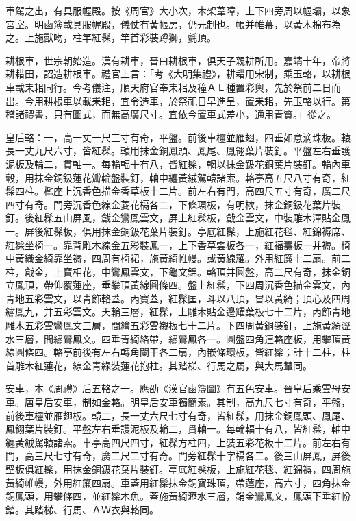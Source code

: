 車駕之出，有具服幄殿。按《周官》大小次，木架葦障，上下四旁周以幄壩，以象宮室。明鹵簿載具服幄殿，儀仗有黃帳房，仍元制也。帳并帷幕，以黃木棉布為之。上施獸吻，柱竿紅髹，竿首彩裝蹲獅，氈頂。

耕根車，世宗朝始造。漢有耕車，晉曰耕根車，俱天子親耕所用。嘉靖十年，帝將耕耤田，詔造耕根車。禮官上言：「考《大明集禮》，耕耤用宋制，乘玉輅，以耕根車載耒耜同行。今考儀注，順天府官奉耒耜及穜ＡＬ種置彩輿，先於祭前二日而出。今用耕根車以載耒耜，宜令造車，於祭祀日早進呈，置耒耜，先玉輅以行。第稽諸禮書，只有圖式，而無高廣尺寸。宜依今置車式差小，通用青質。」從之。

皇后輅：一，高一丈一尺三寸有奇，平盤。前後車欞並雁翅，四垂如意滴珠板。轅長一丈九尺六寸，皆紅髹。轅用抹金銅鳳頭、鳳尾、鳳翎葉片裝釘。平盤左右垂護泥板及輪二，貫軸一。每輪輻十有八，皆紅髹，輞以抹金鈒花銅葉片裝釘。輪內車轂，用抹金銅鈒蓮花瓣輪盤裝釘，軸中纏黃絨駕轅諸索。輅亭高五尺八寸有奇，紅髹四柱。檻座上沉香色描金香草板十二片。前左右有門，高四尺五寸有奇，廣二尺四寸有奇。門旁沉香色線金菱花槅各二，下條環板，有明栨，抹金銅鈒花葉片裝釘。後紅髹五山屏風，戧金鸞鳳雲文，屏上紅髹板，戧金雲文，中裝雕木渾貼金鳳一。屏後紅髹板，俱用抹金銅鈒花葉片裝釘。亭底紅髹，上施紅花毯、紅錦褥席、紅髹坐椅一。靠背雕木線金五彩裝鳳一，上下香草雲板各一，紅福壽板一并褥。椅中黃織金綺靠坐褥，四周有椅裙，施黃綺帷幔。或黃線羅。外用紅簾十二扇。前二柱，戧金，上寶相花，中鸞鳳雲文，下龜文錦。輅頂并圓盤，高二尺有奇，抹金銅立鳳頂，帶仰覆蓮座，垂攀頂黃線圓條四。盤上紅髹，下四周沉香色描金雲文，內青地五彩雲文，以青飾輅蓋。內寶蓋，紅髹匡，斗以八頂，冒以黃綺；頂心及四周繡鳳九，并五彩雲文。天輪三層，紅髹，上雕木貼金邊耀葉板七十二片，內飾青地雕木五彩雲鸞鳳文三層，間繪五彩雲襯板七十二片。下四周黃銅裝釘，上施黃綺瀝水三層，間繡鸞鳳文。四垂青綺絡帶，繡鸞鳳各一。圓盤四角連輅座板，用攀頂黃線圓條四。輅亭前後有左右轉角闌干各二扇，內嵌條環板，皆紅髹；計十二柱，柱首雕木紅蓮花，線金青綠裝蓮花抱柱。其踏梯、行馬之屬，與大馬輦同。

安車，本《周禮》后五輅之一。應劭《漢官鹵簿圖》有五色安車。晉皇后乘雲母安車。唐皇后安車，制如金輅。明皇后安車獨簡素。其制，高九尺七寸有奇，平盤，前後車欞並雁翅板。轅二，長一丈六尺七寸有奇，皆紅髹，用抹金銅鳳頭、鳳尾、鳳翎葉片裝釘。平盤左右垂護泥板及輪二，貫軸一。每輪輻十有八，皆紅髹，軸中纏黃絨駕轅諸索。車亭高四尺四寸，紅髹方柱四，上裝五彩花板十二片。前左右有門，高三尺七寸有奇，廣二尺二寸有奇。門旁紅髹十字槅各二。後三山屏鳳，屏後壁板俱紅髹，用抹金銅鈒花葉片裝釘。亭底紅髹板，上施紅花毯、紅錦褥，四周施黃綺帷幔，外用紅簾四扇。車蓋用紅髹抹金銅寶珠頂，帶蓮座，高六寸，四角抹金銅鳳頭，用攀條四，並紅髹木魚。蓋施黃綺瀝水三層，銷金鸞鳳文，鳳頭下垂紅帉錔。其踏梯、行馬、ＡＷ衣與輅同。

